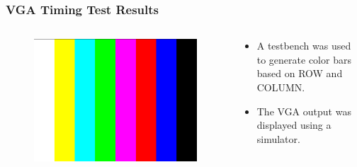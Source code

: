 \documentclass{beamer}
\begin{document}
\begin{frame}
\frametitle{VGA Timing Test Results}

\begin{columns}[onlytextwidth]
  \begin{column}{0.5\linewidth}
  
  	\begin{figure}[!htb]
      \includegraphics[width=\linewidth]{vga_timing_test_result.png}
	\end{figure}
    
  \end{column}
  \begin{column}{0.45\linewidth}
  
  	\begin{itemize}
      \item A testbench was used to generate color bars based on ROW and COLUMN.
      \item The VGA output was displayed using a simulator.
	\end{itemize}
    
  \end{column}
\end{columns}

\end{frame}
\end{document}
